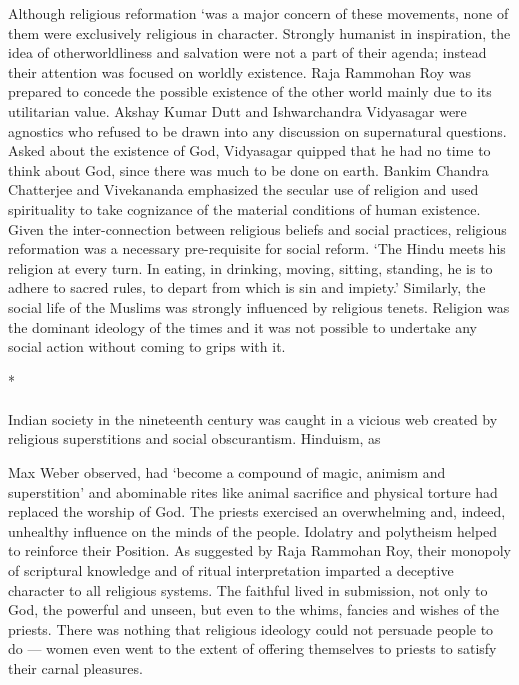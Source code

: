 Although religious reformation `was a major concern of these movements, none of them were exclusively religious in character. Strongly humanist in inspiration, the idea of otherworldliness and salvation were not a part of their agenda; instead their attention was focused on worldly existence. Raja Rammohan Roy was prepared to concede the possible existence of the other world mainly due to its utilitarian value. Akshay Kumar Dutt and Ishwarchandra Vidyasagar were agnostics who refused to be drawn into any discussion on supernatural questions. Asked about the existence of God, Vidyasagar quipped that he had no time to think about God, since there was much to be done on earth. Bankim Chandra Chatterjee and Vivekananda emphasized the secular use of religion and used spirituality to take cognizance of the material conditions of human existence. Given the inter-connection between religious beliefs and social practices, religious reformation was a necessary pre-requisite for social reform. `The Hindu meets his religion at every turn. In eating, in drinking, moving, sitting, standing, he is to adhere to sacred rules, to depart from which is sin and impiety.' Similarly, the social life of the Muslims was strongly influenced by religious tenets. Religion was the dominant ideology of the times and it was not possible to undertake any social action without coming to grips with it.

\begin{center}*\end{center}

\paragraph*{}

Indian society in the nineteenth century was caught in a vicious web created by religious superstitions and social obscurantism. Hinduism, as

Max Weber observed, had `become a compound of magic, animism and superstition' and abominable rites like animal sacrifice and physical torture had replaced the worship of God. The priests exercised an overwhelming and, indeed, unhealthy influence on the minds of the people. Idolatry and polytheism helped to reinforce their Position. As suggested by Raja Rammohan Roy, their monopoly of scriptural knowledge and of ritual interpretation imparted a deceptive character to all religious systems. The faithful lived in submission, not only to God, the powerful and unseen, but even to the whims, fancies and wishes of the priests. There was nothing that religious ideology could not persuade people to do --- women even went to the extent of offering themselves to priests to satisfy their carnal pleasures.

